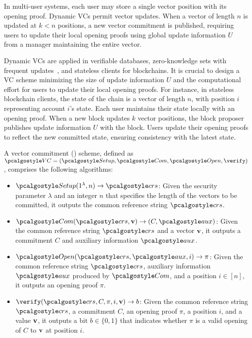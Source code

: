 \documentclass{iacrcc}
\begin{document}
In multi-user systems, each user may store a single vector position with its opening proof. Dynamic VCs permit vector updates. When a vector of length \( n \) is updated at \( k < n \) positions, a new vector commitment is published, requiring users to update their local opening proofs using global update information \( U \) from a manager maintaining the entire vector.

Dynamic VCs are applied in verifiable databases, zero-knowledge sets with frequent updates~\cite{PKC:CatFio13}, and stateless clients for blockchains. It is crucial to design a VC scheme minimizing the size of update information \( U \) and the computational effort for users to update their local opening proofs. For instance, in stateless blockchain clients, the state of the chain is a vector of length \( n \), with position \( i \) representing account \( i \)'s state. Each user maintains their state locally with an opening proof. When a new block updates \( k \) vector positions, the block proposer publishes update information \( U \) with the block. Users update their opening proofs to reflect the new committed state, ensuring consistency with the latest state.

\begin{definition}
A vector commitment (\VC) scheme, defined as $\VC = (\setup, \commit, \open, \verify)$, comprises the following algorithms:
\begin{itemize}
    \item $\setup(1^\lambda, n) \rightarrow \crs$: Given the security parameter $\lambda$ and an integer $n$ that specifies the length of the vectors to be committed, it outputs the common reference string $\crs$.
    \item $\commit(\crs, \vvec) \rightarrow (C, \aux)$: Given the common reference string $\crs$ and a vector $\mathbf{v}$, it outputs a commitment $C$ and auxiliary information $\aux$.
    \item $\open(\crs, \aux, i) \rightarrow \pi$: Given the common reference string $\crs$, auxiliary information $\aux$ produced by $\commit$, and a position $i \in [n]$, it outputs an opening proof $\pi$.
    \item $\verify(\crs, C, \pi, i, \vvec) \rightarrow b$: Given the common reference string $\crs$, a commitment $C$, an opening proof $\pi$, a position $i$, and a value $\mathbf{v}$, it outputs a bit $b \in \{0, 1\}$ that indicates whether $\pi$ is a valid opening of $C$ to $\mathbf{v}$ at position $i$.
\end{itemize}
\end{definition}
\end{document}
